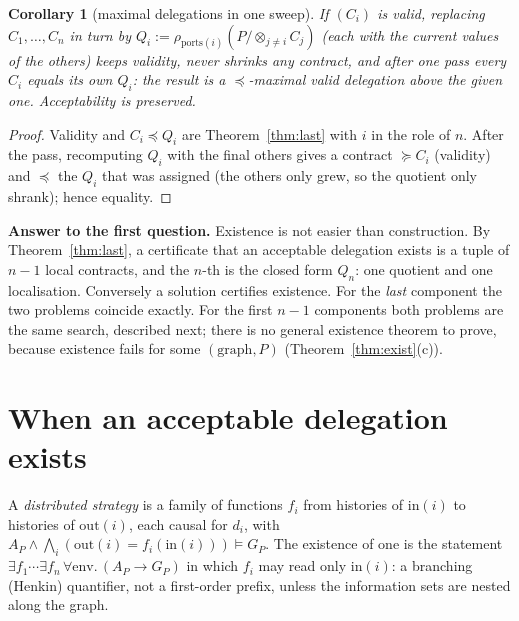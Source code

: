 \documentclass[10pt]{article}
\theoremstyle{plain}\newtheorem{theorem}{Theorem}\newtheorem{lemma}{Lemma}\newtheorem{proposition}{Proposition}\newtheorem{corollary}{Corollary}
\theoremstyle{definition}\newtheorem{definition}{Definition}
\newcommand{\refines}{\preccurlyeq}\newcommand{\comp}{\otimes}\newcommand{\Tr}{\mathrm{Tr}}
\newcommand{\ports}{\mathrm{ports}}\newcommand{\inp}{\mathrm{in}}\newcommand{\outp}{\mathrm{out}}
\begin{document}
\begin{corollary}[maximal delegations in one sweep]
If $(C_i)$ is valid, replacing $C_1,\dots,C_n$ in turn by $Q_i:=\rho_{\ports(i)}(P/\comp_{j\ne i}C_j)$ (each with the current values of the others) keeps validity, never shrinks any contract, and after one pass every $C_i$ equals its own $Q_i$: the result is a $\refines$-maximal valid delegation above the given one. Acceptability is preserved.
\end{corollary}
\begin{proof}
Validity and $C_i\refines Q_i$ are Theorem~\ref{thm:last} with $i$ in the role of $n$. After the pass, recomputing $Q_i$ with the final others gives a contract $\succcurlyeq C_i$ (validity) and $\refines$ the $Q_i$ that was assigned (the others only grew, so the quotient only shrank); hence equality.
\end{proof}

\textbf{Answer to the first question.} Existence is not easier than construction. By Theorem~\ref{thm:last}, a certificate that an acceptable delegation exists is a tuple of $n-1$ local contracts, and the $n$-th is the closed form $Q_n$: one quotient and one localisation. Conversely a solution certifies existence. For the \emph{last} component the two problems coincide exactly. For the first $n-1$ components both problems are the same search, described next; there is no general existence theorem to prove, because existence fails for some $(\text{graph},P)$ (Theorem~\ref{thm:exist}(c)).

\section{When an acceptable delegation exists}
A \emph{distributed strategy} is a family of functions $f_i$ from histories of $\inp(i)$ to histories of $\outp(i)$, each causal for $d_i$, with $A_P\wedge\bigwedge_i(\outp(i)=f_i(\inp(i)))\models G_P$. The existence of one is the statement $\exists f_1\cdots\exists f_n\,\forall\text{env}.\,(A_P\to G_P)$ in which $f_i$ may read only $\inp(i)$: a branching (Henkin) quantifier, not a first-order prefix, unless the information sets are nested along the graph.
\end{document}
